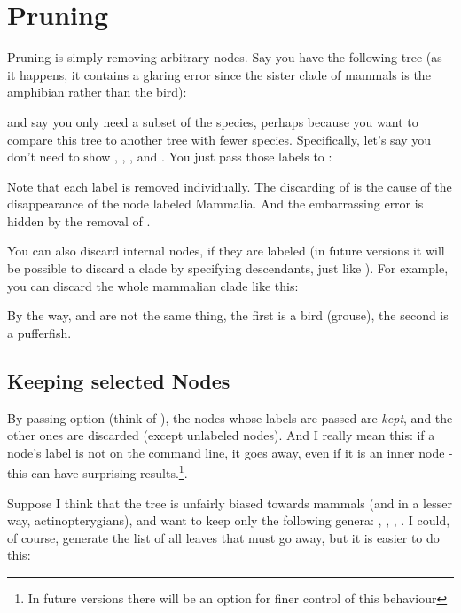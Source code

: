 \section[sct_prune]{Pruning}


Pruning is simply removing arbitrary nodes. Say you have the following tree (as
it happens, it contains a glaring error since the sister clade of mammals is the
amphibian rather than the bird):


and say you only need a subset of the species, perhaps because you
want to compare this tree to another tree with fewer species. Specifically,
let's say you don't need to show , ,
, and . You just pass those labels to
\prune:


Note that each label is removed individually. The discarding of
 is the cause of the disappearance of the node labeled
Mammalia. And the embarrassing error is hidden by the removal of
.

You can also discard internal nodes, if they are labeled (in future versions
it will be possible to discard a clade by specifying descendants, just like
\clade). For example, you can discard the whole mammalian clade like this:


By the way,  and  are not the same thing, the
first is a bird (grouse), the second is a pufferfish.

\subsection{Keeping selected Nodes}

By passing option  (think of ), the nodes whose
labels are passed are {\em kept}, and the other ones are discarded (except
unlabeled nodes). And I really mean this: if a node's label is not on the
command line, it goes away, even if it is an inner node - this can have
surprising results.\footnote{In future versions there will be an option for
finer control of this behaviour}.

Suppose I think that the tree is unfairly biased towards mammals (and in a
lesser way, actinopterygians), and want to keep only the following genera:
, , , . I could, of
course, generate the list of all leaves that must go away, but it is easier to
do this:

